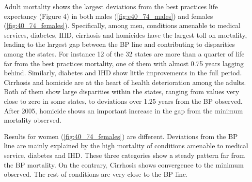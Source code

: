 \documentclass{article}
\begin{document}
\begin{spacing}{1.5}
Adult mortality shows the largest deviations from the best practices life expectancy (Figure 4) in both males (\ref{fig:e40_74_males}) and females (\ref{fig:40_74_females}). Specifically, among men, conditions amenable to medical services, diabetes, IHD, cirrhosis and homicides have the largest toll on mortality, leading to the largest gap between the BP line and contributing to disparities among the states. For instance 12 of the 32 states are more than a quarter of life far from the best practices mortality, one of them with almost 0.75 years lagging behind. Similarly, diabetes and IHD show little improvements in the full period. Cirrhosis and homicide are at the heart of health deterioration among the adults. Both of them show large disparities within the states, ranging from values very close to zero in some states, to deviations over 1.25 years from the BP observed. After 2005, homicide shows an important increase in the gap from the minimum mortality observed. 

Results for women  (\ref{fig:40_74_females}) are different. Deviations from the BP line are mainly explained by the high mortality of conditions amenable to medical service, diabetes and IHD. These three categories show a steady pattern far from the BP mortality. On the contrary, Cirrhosis shows convergence to the minimum observed. The rest of conditions are very close to the BP line. 


\end{spacing}
\end{document}
